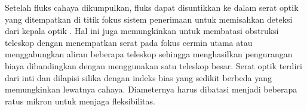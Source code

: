Setelah fluks cahaya dikumpulkan, fluks dapat disuntikkan ke dalam serat optik yang ditempatkan di titik fokus sistem penerimaan untuk memisahkan deteksi dari kepala optik \lidar. Hal ini juga memungkinkan untuk membatasi obstruksi teleskop dengan menempatkan serat pada fokus cermin utama atau menggabungkan aliran beberapa teleskop sehingga menghasilkan pengurangan biaya dibandingkan dengan menggunakan satu teleskop besar. Serat optik terdiri dari inti dan dilapisi silika dengan indeks bias yang sedikit berbeda yang memungkinkan lewatnya cahaya. Diameternya harus dibatasi menjadi beberapa ratus mikron untuk menjaga fleksibilitas.

